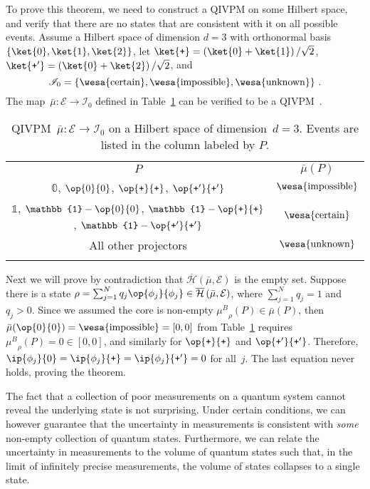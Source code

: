 \documentclass[english,reprint, aps, prl,superscriptaddress, showpacs,
showkeys, longbibliography, amsmath, amssymb, floatfix]{revtex4-1}
\theoremstyle{plain}
\theoremstyle{definition}
\newcommand{\Hilb}{\mathcal{H}}
\newcommand{\events}{\ensuremath{\mathcal{E}}}
\newcommand{\imposs}{{\text{\wesa{impossible}}}}
\newcommand{\necess}{{\text{\wesa{certain}}}}
\newcommand{\unknown}{{\text{\wesa{unknown}}}}
\newcommand{\proj}[1]{\op{#1}{#1}}
\newcommand{\ps}{\texttt{+}}
\newcommand{\coreBorn}{\ensuremath{\overline{\Hilb}}}
\newcommand{\muB}{\ensuremath{\mu^{B}}}
\begin{document}
To prove this theorem, we need to construct a QIVPM on some Hilbert
space, and verify that there are no states that are consistent with it
on all possible events. Assume a Hilbert space of dimension $d=3$ with
orthonormal basis $\left\{ \ket{0},\ket{1},\ket{2}\right\} $, let
$\ket{\ps}=\left(\ket{0}+\ket{1}\right)/\sqrt{2}$,
$\ket{\ps'}=\left(\ket{0}+\ket{2}\right)/\sqrt{2}$, and
\begin{equation}
\mathscr{I}_{0}=\left\{ \necess,\imposs,\unknown\right\} \,.\label{eq:3-value-intervals}
\end{equation}
The map~$\bar{\mu}:\events\rightarrow\mathscr{I}_{0}$ defined in
Table~\ref{tab:non-Born-QIVPM} can be verified to be a
QIVPM~\citep{TaiThesis2018}.
\begin{table}
\caption{\label{tab:non-Born-QIVPM}QIVPM~$\bar{\mu}:\events\rightarrow\mathscr{I}_{0}$
on a Hilbert space of dimension~$d=3$. Events are listed in the column
labeled by $P$.}

\begin{tabular}{cc}
\toprule 
\addlinespace
$P$ & $\bar{\mu}\left(P\right)$\tabularnewline\addlinespace
\midrule
\midrule 
\addlinespace
$\mathbb{0}$, $\proj{0}$, $\proj{\ps}$, $\proj{\ps'}$ & $\imposs$\tabularnewline\addlinespace
\midrule 
\addlinespace
$\mathbb{1}$, $\mathbb{1}-\proj{0}$, $\mathbb{1}-\proj{\ps}$, 
$\mathbb{1}-\proj{\ps'}$ & $\necess$\tabularnewline\addlinespace
\midrule 
\addlinespace
All other projectors & $\unknown$\tabularnewline\addlinespace
\bottomrule
\end{tabular}
\end{table}
Next we will prove by contradiction that
$\coreBorn\left(\bar{\mu},\events\right)$ is the empty set. Suppose
there is a state
$\rho=\sum_{j=1}^{N}q_{j}\proj{\phi_{j}}\in\coreBorn\left(\bar{\mu},\events\right)$,
where $\sum_{j=1}^{N}q_{j}=1$ and $q_{j} > 0$. Since
we assumed the core is non-empty $\muB_{\rho}(P)\in\bar{\mu}(P)$, then
$\bar{\mu}(\proj{0})=\imposs=[0,0]$ from Table~\ref{tab:non-Born-QIVPM} requires
$\muB_{\rho}(P)=0\in[0,0]$, and similarly for $\proj{\ps}$ and $\proj{\ps'}$.
Therefore, $\ip{\phi_{j}}{0}=\ip{\phi_{j}}{\ps}=\ip{\phi_{j}}{\ps'}=0$
for all~$j$. The last equation never holds, proving the theorem.

The fact that a collection of poor measurements on a quantum system
cannot reveal the underlying state is not surprising. Under certain
conditions, we can however guarantee that the uncertainty in
measurements is consistent with \emph{some} non-empty collection of
quantum states. Furthermore, we can relate the uncertainty in
measurements to the volume of quantum states such that, in the limit
of infinitely precise measurements, the volume of states collapses to
a single state.
\end{document}
